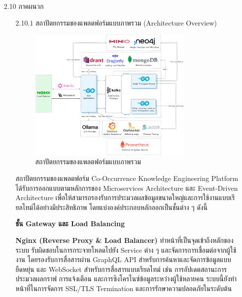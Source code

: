 \documentclass[12pt,a4paper]{article}
\newcommand{\textlight}[1]{{\thailightfont #1}}
\begin{document}
\begin{enumerate}[leftmargin=2cm]
    \item[2.10] ภาคผนวก
    \\
    \begin{enumerate}
        \item[2.10.1] สถาปัตยกรรมของแพลตฟอร์มแบบภาพรวม (Architecture Overview)
        \begin{figure}[H]
            \centering
            \includegraphics[width=0.8\textwidth]{images/co_occurrence_knowlege_engineering_architecture_diagram.png}
            \caption{สถาปัตยกรรมของแพลตฟอร์มแบบภาพรวม}
            \label{fig:architecture_overview}
        \end{figure}

        \textlight{
            \hspace{1cm}สถาปัตยกรรมของแพลตฟอร์ม Co-Occurrence Knowledge Engineering Platform ได้รับการออกแบบตามหลักการของ Microservices Architecture และ Event-Driven Architecture เพื่อให้สามารถรองรับการประมวลผลข้อมูลขนาดใหญ่และการใช้งานแบบเรียลไทม์ได้อย่างมีประสิทธิภาพ โดยแบ่งองค์ประกอบหลักออกเป็นชั้นต่าง ๆ ดังนี้

            \vspace{0.5cm}

            \textbf{ชั้น Gateway และ Load Balancing}

            \hspace{1cm}\textbf{Nginx (Reverse Proxy \& Load Balancer)} ทำหน้าที่เป็นจุดเข้าถึงหลักของระบบ รับผิดชอบในการกระจายโหลดไปยัง Service ต่าง ๆ และจัดการการเชื่อมต่อจากผู้ใช้งาน โดยรองรับการสื่อสารผ่าน GraphQL API สำหรับการค้นหาและจัดการข้อมูลแบบยืดหยุ่น และ WebSocket สำหรับการสื่อสารแบบเรียลไทม์ เช่น การอัปเดตสถานะการประมวลผลกราฟ การแจ้งเตือน และการซิงโครไนซ์ข้อมูลระหว่างผู้ใช้หลายคน ระบบนี้ยังทำหน้าที่ในการจัดการ SSL/TLS Termination และการรักษาความปลอดภัยในระดับต้น

}
\end{enumerate}
\end{enumerate}
\end{document}
